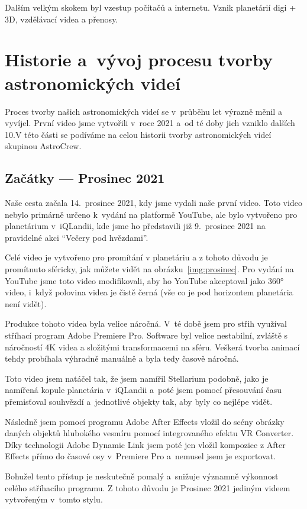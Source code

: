 \documentclass[12pt,a4paper,titlepage]{article}
\begin{document}
Dalším velkým skokem byl vzestup počítačů a internetu. Vznik planetárií digi + 3D, vzdělávací videa a přenosy.
\section{Historie a~vývoj procesu tvorby astronomických videí}
Proces tvorby našich astronomických videí se v~průběhu let výrazně měnil a vyvíjel. První video jsme vytvořili v~roce 2021 a~od té doby jich vzniklo dalších 10.V této části se podíváme na celou historii tvorby astronomických videí skupinou AstroCrew.
\subsection{Začátky --- Prosinec 2021}
Naše cesta začala 14.\ prosince 2021, kdy jsme vydali naše první video. Toto video nebylo primárně určeno k~vydání na platformě YouTube, ale bylo vytvořeno pro planetárium v~iQLandii, kde jsme ho představili již 9.\ prosince 2021 na pravidelné akci \enquote{Večery pod hvězdami}. 

Celé video je vytvořeno pro promítání v planetáriu a z tohoto důvodu je promítnuto sféricky, jak můžete vidět na obrázku~\ref{img:prosinec}. Pro vydání na YouTube jsme toto video modifikovali, aby ho YouTube akceptoval jako 360° video, i~když polovina videa je čistě černá (vše co je pod horizontem planetária není vidět). 

Produkce tohoto videa byla velice náročná. V~té době jsem pro střih využíval stříhací program Adobe Premiere Pro. Software byl velice nestabilní, zvláště s náročností 4K videa a složitými transformacemi na sféru. Veškerá tvorba animací tehdy probíhala výhradně manuálně a byla tedy časově náročná. 

Toto video jsem natáčel tak, že jsem namířil Stellarium podobně, jako je namířená kopule planetária v~iQLandii a~poté jsem pomocí přesouvání času přemisťoval souhvězdí a~jednotlivé objekty tak, aby byly co nejlépe vidět. 

Následně jsem pomocí programu Adobe After Effects vložil do scény obrázky daných objektů hlubokého vesmíru pomocí integrovaného efektu VR Converter. Díky technologii Adobe Dynamic Link jsem poté jen vložil kompozice z After Effects přímo do časové osy v~Premiere Pro a~nemusel jsem je exportovat. 

Bohužel tento přístup je neskutečně pomalý a~snižuje významně výkonnost celého stříhacího programu. Z tohoto důvodu je Prosinec 2021 jediným videem vytvořeným v~tomto stylu.
\end{document}

